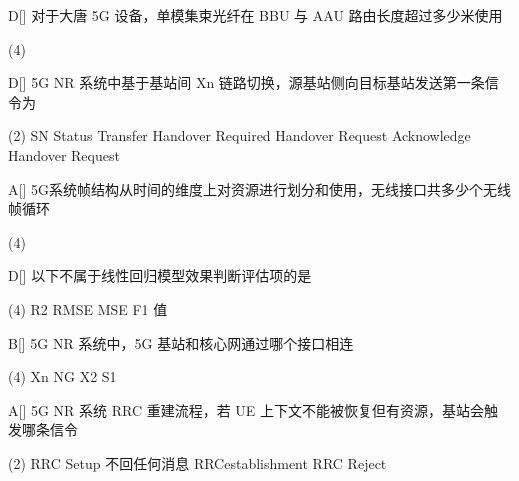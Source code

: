 \begin{choice}{D}[]
    对于大唐 5G 设备，单模集束光纤在 BBU 与 AAU 路由长度超过多少米使用
    \begin{tasks}(4)
    \end{tasks}
\end{choice}

\begin{choice}{D}[]
    5G NR 系统中基于基站间 Xn 链路切换，源基站侧向目标基站发送第一条信令为
    \begin{tasks}(2)
        \task SN Status Transfer
        \task Handover Required
        \task Handover Request Acknowledge
        \task Handover Request
    \end{tasks}
\end{choice}




\begin{choice}{A}[]
    5G系统帧结构从时间的维度上对资源进行划分和使用，无线接口共多少个无线帧循环
    \begin{tasks}(4)

    \end{tasks}
\end{choice}


\begin{choice}{D}[]
    以下不属于线性回归模型效果判断评估项的是
    \begin{tasks}(4)
        \task R2
        \task RMSE
        \task MSE
        \task F1 值
    \end{tasks}
\end{choice}


\begin{choice}{B}[]
    5G NR 系统中，5G 基站和核心网通过哪个接口相连
    \begin{tasks}(4)
        \task Xn
        \task NG
        \task X2
        \task S1
    \end{tasks}
\end{choice}


\begin{choice}{A}[]
    5G NR 系统 RRC 重建流程，若 UE 上下文不能被恢复但有资源，基站会触发哪条信令
    \begin{tasks}(2)
        \task RRC Setup
        \task 不回任何消息
        \task RRCestablishment
        \task RRC Reject
    \end{tasks}
\end{choice}

